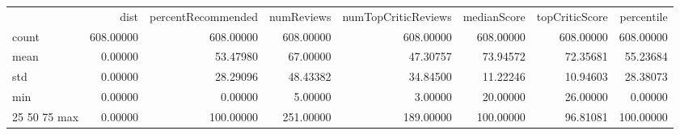 \begin{tabular}{lrrrrrrr}
 & dist & percentRecommended & numReviews & numTopCriticReviews & medianScore & topCriticScore & percentile \\
count & 608.00000 & 608.00000 & 608.00000 & 608.00000 & 608.00000 & 608.00000 & 608.00000 \\
mean & 0.00000 & 53.47980 & 67.00000 & 47.30757 & 73.94572 & 72.35681 & 55.23684 \\
std & 0.00000 & 28.29096 & 48.43382 & 34.84500 & 11.22246 & 10.94603 & 28.38073 \\
min & 0.00000 & 0.00000 & 5.00000 & 3.00000 & 20.00000 & 26.00000 & 0.00000 \\
25%
50%
75%
max & 0.00000 & 100.00000 & 251.00000 & 189.00000 & 100.00000 & 96.81081 & 100.00000 \\
\end{tabular}
